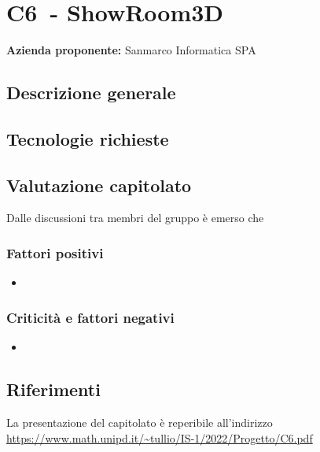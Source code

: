 
\renewcommand{\capName}{ShowRoom3D} %
\renewcommand{\capCode}{C6} %
\renewcommand{\capLink}{https://www.math.unipd.it/~tullio/IS-1/2022/Progetto/C6.pdf} %
\renewcommand{\capProposer}{SanMarco Informatica} %


\section{\capCode\ - \capName}
\textbf{Azienda proponente:} Sanmarco Informatica SPA
\subsection{Descrizione generale}

\subsection{Tecnologie richieste}

\subsection{Valutazione capitolato}
Dalle discussioni tra membri del gruppo è emerso che

\subsubsection{Fattori positivi}

\begin{itemize}
    \item 
\end{itemize}

\subsubsection{Criticità e fattori negativi}

\begin{itemize}
    \item 
\end{itemize}

\subsection{Riferimenti}
La presentazione del capitolato è reperibile all'indirizzo \url{\capLink}
